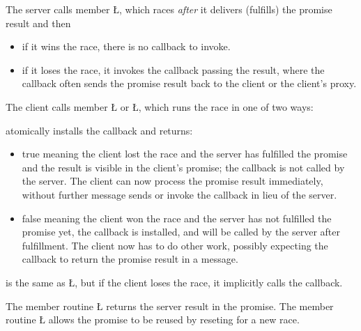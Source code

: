 \documentclass[openright,twoside]{report}
\begin{document}
The server calls member \LGinlinetrue\LGbegin\lgrinde\L{}\endlgrinde\LGend{}, which races \emph{after} it delivers (fulfills) the promise result and then
\begin{itemize}[topsep=5pt,parsep=0pt]
\item
if it wins the race, there is no callback to invoke.
\item
if it loses the race, it invokes the callback passing the result, where the callback often sends the promise result back to the client or the client's proxy.
\end{itemize}
The client calls member \LGinlinetrue\LGbegin\lgrinde\L{}\endlgrinde\LGend{} or \LGinlinetrue\LGbegin\lgrinde\L{}\endlgrinde\LGend{}, which runs the race in one of two ways:
\begin{description}[leftmargin=3pt,topsep=5pt,parsep=0pt]
\item[\LGinlinetrue\LGbegin\lgrinde\L{\LB{\V{maybe}}}\endlgrinde\LGend{}] 
atomically installs the callback and returns:
\begin{itemize}
\item
true meaning the client lost the race and the server has fulfilled the promise and the result is visible in the client's promise;
the callback is not called by the server.
The client can now process the promise result immediately, without further message sends or invoke the callback in lieu of the server.
\item
false meaning the client won the race and the server has not fulfilled the promise yet, the callback is installed, and will be called by the server after fulfillment.
The client now has to do other work, possibly expecting the callback to return the promise result in a message.
\end{itemize}
\item[\LGinlinetrue\LGbegin\lgrinde\L{\LB{\V{then}}}\endlgrinde\LGend{}]
is the same as \LGinlinetrue\LGbegin\lgrinde\L{}\endlgrinde\LGend{}, but if the client loses the race, it implicitly calls the callback.
\end{description}
The member routine \LGinlinetrue\LGbegin\lgrinde\L{}\endlgrinde\LGend{} returns the server result in the promise.
The member routine \LGinlinetrue\LGbegin\lgrinde\L{}\endlgrinde\LGend{} allows the promise to be reused by reseting for a new race.
\end{document}
